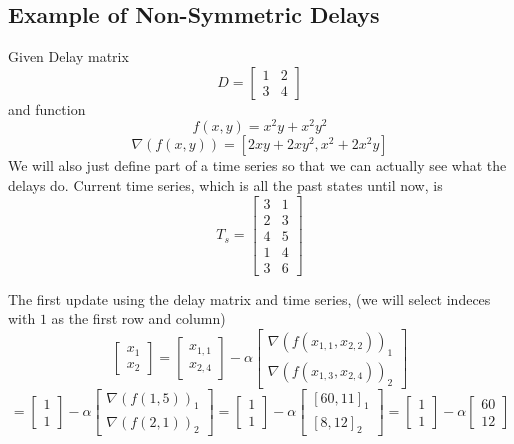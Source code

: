 \documentclass[10pt]{elsarticle}
\theoremstyle{remark}
\begin{document}
\subsection*{Example of Non-Symmetric Delays}
Given Delay matrix
\begin{equation}
D = \begin{bmatrix}
1&2 \\
3&4 
\end{bmatrix}
\end{equation}
and function
\begin{equation}
f(x,y) = x^2y+x^2y^2
\end{equation}
\begin{equation}
\nabla(f(x,y)) = [2xy+2xy^2, x^2+2x^2y]
\end{equation}
We will also just define part of a time series so that we can actually see what the delays do.
Current time series, which is all the past states until now, is
\[
T_s = \begin{bmatrix}
3&1 \\
2&3 \\
4&5 \\
1&4 \\
3&6
\end{bmatrix}
\]

The first update using the delay matrix and time series, (we will select indeces with $1$ as the first row and column)
\[
\begin{bmatrix}
    x_{1}\\
    x_{2}
\end{bmatrix} = 
\begin{bmatrix}
    x_{1,1}\\
    x_{2,4}   
\end{bmatrix} - \alpha
\begin{bmatrix}
    \nabla(f(x_{1,1},x_{2,2}))_{1} \\
    \nabla(f(x_{1,3},x_{2,4}))_{2}
\end{bmatrix}
\]
\[
 = 
\begin{bmatrix}
    1 \\
    1
\end{bmatrix} - \alpha
\begin{bmatrix}
    \nabla(f(1,5))_{1} \\
    \nabla(f(2,1))_{2}
\end{bmatrix}
 = 
\begin{bmatrix}
    1 \\
    1
\end{bmatrix} - \alpha
\begin{bmatrix}
    [60,11]_{1} \\ 
    [8, 12]_{2}
\end{bmatrix} = 
\begin{bmatrix}
    1 \\
    1
\end{bmatrix} - \alpha
\begin{bmatrix}
    60 \\
    12
\end{bmatrix}
\]
\end{document}
